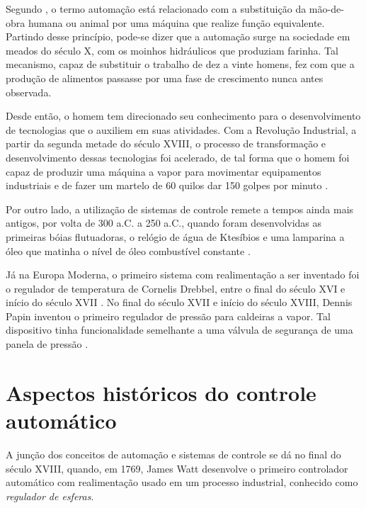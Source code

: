 \label{cap:introducao}

Segundo , o termo automação está relacionado com a
substituição da mão-de-obra humana ou animal por uma máquina que realize função
equivalente. Partindo desse princípio, pode-se dizer que a automação surge na
sociedade em meados do século X, com os moinhos hidráulicos que produziam
farinha. Tal mecanismo, capaz de substituir o trabalho de dez a vinte homens,
fez com que a produção de alimentos passasse por uma fase de crescimento nunca
antes observada.

Desde então, o homem tem direcionado seu conhecimento para o desenvolvimento de
tecnologias que o auxiliem em suas atividades. Com a Revolução Industrial, a
partir da segunda metade do século XVIII, o processo de transformação e
desenvolvimento dessas tecnologias foi acelerado, de tal forma que o homem foi
capaz de produzir uma máquina a vapor para movimentar equipamentos industriais e
de fazer um martelo de 60 quilos dar 150 golpes por minuto \cite{goeking:2010}.

Por outro lado, a utilização de sistemas de controle remete a tempos ainda mais
antigos, por volta de 300 a.C. a 250 a.C., quando foram desenvolvidas as
primeiras bóias flutuadoras, o relógio de água de Ktesíbios e uma lamparina a
óleo que matinha o nível de óleo combustível constante
\cite{mayr:1970,mayr:1971,mayr:1975}.

Já na Europa Moderna, o primeiro sistema com realimentação a ser inventado foi o
regulador de temperatura de Cornelis Drebbel, entre o final do século XVI e
início do século XVII \cite{mayr:1975}. No final do século XVII e início do
século XVIII, Dennis Papin inventou o primeiro regulador de pressão para
caldeiras a vapor. Tal dispositivo tinha funcionalidade semelhante a uma válvula
de segurança de uma panela de pressão \cite{dorf:2009}. 

\section{Aspectos históricos do controle automático}
A junção dos conceitos de automação e sistemas de controle se dá no final do
século XVIII, quando, em 1769, James Watt desenvolve o primeiro controlador
automático com realimentação usado em um processo industrial, conhecido como
{\it regulador de esferas}.

